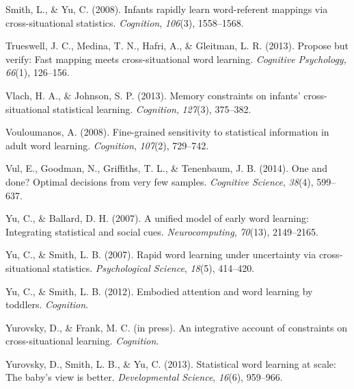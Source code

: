 \documentclass[a4paper,man,natbib]{apa6}
\begin{document}
Smith, L., \& Yu, C. (2008). Infants rapidly learn word-referent
mappings via cross-situational statistics. \emph{Cognition},
\emph{106}(3), 1558--1568.

Trueswell, J. C., Medina, T. N., Hafri, A., \& Gleitman, L. R. (2013).
Propose but verify: Fast mapping meets cross-situational word learning.
\emph{Cognitive Psychology}, \emph{66}(1), 126--156.

Vlach, H. A., \& Johnson, S. P. (2013). Memory constraints on infants'
cross-situational statistical learning. \emph{Cognition}, \emph{127}(3),
375--382.

Vouloumanos, A. (2008). Fine-grained sensitivity to statistical
information in adult word learning. \emph{Cognition}, \emph{107}(2),
729--742.

Vul, E., Goodman, N., Griffiths, T. L., \& Tenenbaum, J. B. (2014). One
and done? Optimal decisions from very few samples. \emph{Cognitive
Science}, \emph{38}(4), 599--637.

Yu, C., \& Ballard, D. H. (2007). A unified model of early word
learning: Integrating statistical and social cues.
\emph{Neurocomputing}, \emph{70}(13), 2149--2165.

Yu, C., \& Smith, L. B. (2007). Rapid word learning under uncertainty
via cross-situational statistics. \emph{Psychological Science},
\emph{18}(5), 414--420.

Yu, C., \& Smith, L. B. (2012). Embodied attention and word learning by
toddlers. \emph{Cognition}.

Yurovsky, D., \& Frank, M. C. (in press). An integrative account of
constraints on cross-situational learning. \emph{Cognition}.

Yurovsky, D., Smith, L. B., \& Yu, C. (2013). Statistical word learning
at scale: The baby's view is better. \emph{Developmental Science},
\emph{16}(6), 959--966.


\end{document}
